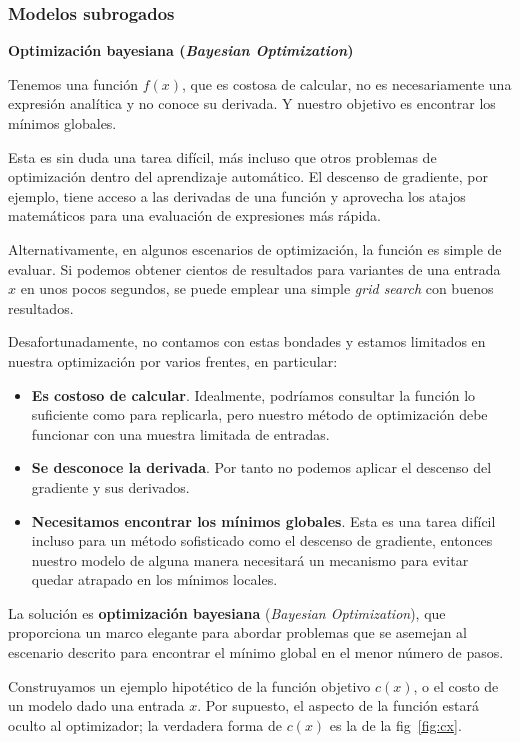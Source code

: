 \documentclass[a4paper,12pt]{article}
\begin{document}
\subsubsection{Modelos subrogados}

\textbf{Optimización bayesiana (\textit{Bayesian Optimization})} 

Tenemos una función $f(x)$, que es costosa de calcular, no es necesariamente una expresión analítica y no conoce su derivada. Y nuestro objetivo es encontrar los mínimos globales. \citep{Ye2020Oct}

Esta es sin duda una tarea difícil, más incluso que otros problemas de optimización dentro del aprendizaje automático. El descenso de gradiente, por ejemplo, tiene acceso a las derivadas de una función y aprovecha los atajos matemáticos para una evaluación de expresiones más rápida.

Alternativamente, en algunos escenarios de optimización, la función es simple de evaluar. Si podemos obtener cientos de resultados para variantes de una entrada $x$ en unos pocos segundos, se puede emplear una simple \textit{grid search} con buenos resultados.

Desafortunadamente, no contamos con estas bondades y estamos limitados en nuestra optimización por varios frentes, en particular:
\begin{itemize}[noitemsep, topsep=2pt]
	\item \textbf{Es costoso de calcular}. Idealmente, podríamos consultar la función lo suficiente como para replicarla, pero nuestro método de optimización debe funcionar con una muestra limitada de entradas.
	\item \textbf{Se desconoce la derivada}. Por tanto no podemos aplicar el descenso del gradiente y sus derivados.
	\item \textbf{Necesitamos encontrar los mínimos globales}. Esta es una tarea difícil incluso para un método sofisticado como el descenso de gradiente, entonces nuestro modelo de alguna manera necesitará un mecanismo para evitar quedar atrapado en los mínimos locales.
\end{itemize}

La solución es \textbf{optimización bayesiana} (\textit{Bayesian Optimization}), que proporciona un marco elegante para abordar problemas que se asemejan al escenario descrito para encontrar el mínimo global en el menor número de pasos.

Construyamos un ejemplo hipotético de la función objetivo $c(x)$, o el costo de un modelo dado una entrada $x$. Por supuesto, el aspecto de la función estará oculto al optimizador; la verdadera forma de $c(x)$ es la de la fig~\ref{fig:cx}.
\end{document}

